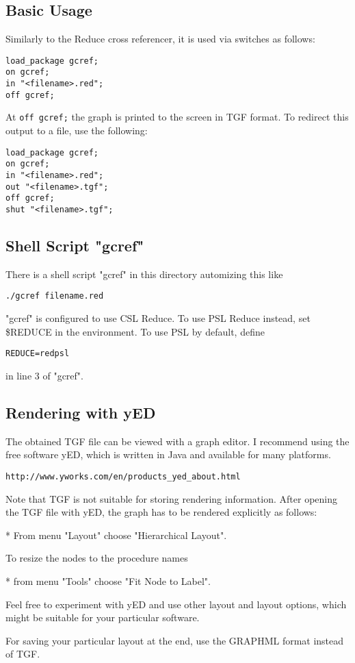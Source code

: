 

\subsection{Basic Usage}


Similarly to the Reduce cross referencer, it is used via switches as follows:
\begin{verbatim}
load_package gcref;
on gcref;
in "<filename>.red";
off gcref;
\end{verbatim}
At \texttt{off gcref;} the graph is printed to the screen in TGF format. 
To redirect this output to a file, use the following:
\begin{verbatim}
load_package gcref;
on gcref;
in "<filename>.red";
out "<filename>.tgf";
off gcref;
shut "<filename>.tgf";
\end{verbatim}

\subsection{Shell Script "gcref"}

There is a shell script "gcref" in this directory automizing this like
\begin{verbatim}
./gcref filename.red
\end{verbatim}
"gcref" is configured to use CSL Reduce. To use PSL Reduce instead, set
\$REDUCE in the environment. To use PSL by default, define
\begin{verbatim}
REDUCE=redpsl
\end{verbatim}
in line 3 of "gcref".


\subsection{Rendering with yED}

The obtained TGF file can be viewed with a graph editor. I recommend using the
free software yED, which is written in Java and available for many platforms.
\begin{verbatim}
http://www.yworks.com/en/products_yed_about.html
\end{verbatim}
Note that TGF is not suitable for storing rendering information. After opening
the TGF file with yED, the graph has to be rendered explicitly as follows:

* From menu "Layout" choose "Hierarchical Layout".

To resize the nodes to the procedure names

* from menu "Tools" choose "Fit Node to Label".

Feel free to experiment with yED and use other layout and layout options, which
might be suitable for your particular software.

For saving your particular layout at the end, use the GRAPHML format instead of
TGF.

